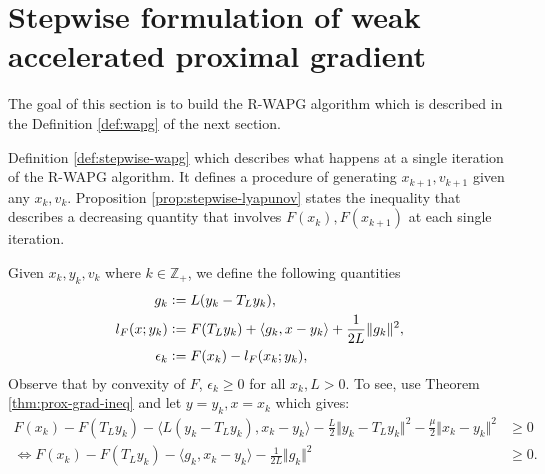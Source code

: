 \documentclass[12pt]{article}
\begin{document}
\section{Stepwise formulation of weak accelerated proximal gradient}\label{sec:stepwise-stuff}
    The goal of this section is to build the R-WAPG algorithm which is described in the Definition \ref{def:wapg} of the next section. 
    \par 
    Definition \ref{def:stepwise-wapg} which describes what happens at a single iteration of the R-WAPG algorithm. 
    It defines a procedure of generating $x_{k + 1}, v_{k + 1}$ given any $x_k, v_k$. 
    Proposition \ref{prop:stepwise-lyapunov} states the inequality that describes a decreasing quantity that involves $F(x_k), F(x_{k + 1})$ at each single iteration. 
    \begin{assumption}
        Given $x_k, y_k, v_k$ where $k \in \mathbb Z_+$, we define the following quantities
        \begin{align}
            g_k &\vcentcolon= L(y_k - T_L y_k), 
            \label{eqn:grad-map}
            \\
            l_F(x; y_k) &\vcentcolon= F(T_Ly_k) + \langle g_k, x - y_k\rangle + \frac{1}{2L}\Vert g_k\Vert^2, 
            \label{eqn:lower-linearization}
            \\
            \epsilon_{k} &\vcentcolon= F(x_k) - l_F(x_k; y_k), 
            \label{eqn:regret}
        \end{align}
        Observe that by convexity of $F$, $\epsilon_k \ge 0$ for all $x_k, L > 0$. 
        To see, use Theorem \ref{thm:prox-grad-ineq} and let $y = y_k, x = x_k$ which gives: 
        \begin{align*}
            F(x_k) - F(T_Ly_k)
            - \langle L(y_k - T_Ly_k),x_k - y_k \rangle
            - \frac{L}{2}\Vert y_k - T_Ly_k\Vert^2
            - \frac{\mu}{2}\Vert x_k - y_k\Vert^2
            &\ge 0
            \\
            \iff 
            F(x_k) - F(T_Ly_k)
            - \langle g_k,x_k - y_k \rangle
            - \frac{1}{2L}\Vert g_k\Vert^2
            &\ge 0. 
        \end{align*}
    \end{assumption}
    
\end{document}
